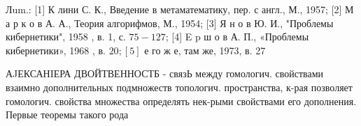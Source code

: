 \documentclass[10pt]{article}
\begin{document}
Лum.: [1] К лини С. К., Введение в метаматематику, пер. с англ., М., 1957; [2] М а р к о в А. А., Теория алгорифмов, М., 1954; [3] Я н о в Ю. И., "Проблемы кибернетики", 1958 , в. 1, с. $75-127$; [4] E p ш о в А. П., «Проблемы кибернетики», 1968 , в. $20 ;[5]$ е го ж е, там же, 1973, в. 27



АJЕКСАНIЕРА ДВОЙТВЕННОСТБ - связЬ между гомологич. свойствами взаимно дополнительных подмножеств топологич. пространства, к-рая позволяет гомологич. свойства множества определять нек-рыми свойствами его дополнения. Первые теоремы такого рода
\end{document}
